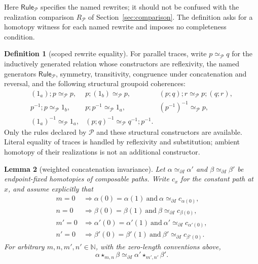 \documentclass[10pt,reqno]{amsart}
\theoremstyle{definition}
\newtheorem{definition}{Definition}[section]
\theoremstyle{plain}
\newtheorem{lemma}[definition]{Lemma}
\theoremstyle{remark}
\newcommand{\RwEq}{\mathrel{\simeq_{\!\mathcal P}}}
\newcommand{\N}{\mathbb N}
\begin{document}
Here $\mathsf{Rule}_{\mathcal P}$ specifies the named rewrites; it should
not be confused with the realization comparison $R_{\mathcal P}$ of Section~\ref{sec:comparison}.
The definition asks for a homotopy witness for each named rewrite and imposes
no completeness condition.

\begin{definition}[scoped rewrite equality]\label{def:scoped-rewrite-equality}
For parallel traces, write $p\RwEq q$ for the inductively generated relation
whose constructors are reflexivity, the named generators $\mathsf{Rule}_{\mathcal P}$,
symmetry, transitivity, congruence under concatenation and reversal, and the
following structural groupoid coherences:
\[
\begin{array}{lll}
(1_a);p\RwEq p, & p;(1_b)\RwEq p, & (p;q);r\RwEq p;(q;r),\\
p^{-1};p\RwEq 1_b, & p;p^{-1}\RwEq 1_a, & (p^{-1})^{-1}\RwEq p,\\
(1_a)^{-1}\RwEq 1_a, & (p;q)^{-1}\RwEq q^{-1};p^{-1}. &
\end{array}
\]
Only the rules declared by $\mathcal P$ and these structural constructors are
available.  Literal equality of traces is handled by reflexivity and
substitution; ambient homotopy of their realizations is not an additional
constructor.
\end{definition}

\begin{lemma}[weighted concatenation invariance]
\label{lem:weighted-concat-invariance}
Let $\alpha\simeq_{\partial I}\alpha'$ and
$\beta\simeq_{\partial I}\beta'$ be endpoint-fixed homotopies of composable
paths.  Write $c_x$ for the constant path at $x$, and assume explicitly that
\[
\begin{aligned}
m=0&\Rightarrow \alpha(0)=\alpha(1)\ \text{and}\ \alpha\simeq_{\partial I}c_{\alpha(0)},\\
n=0&\Rightarrow \beta(0)=\beta(1)\ \text{and}\ \beta\simeq_{\partial I}c_{\beta(0)},\\
m'=0&\Rightarrow \alpha'(0)=\alpha'(1)\ \text{and}\ \alpha'\simeq_{\partial I}c_{\alpha'(0)},\\
n'=0&\Rightarrow \beta'(0)=\beta'(1)\ \text{and}\ \beta'\simeq_{\partial I}c_{\beta'(0)}.
\end{aligned}
\]
For arbitrary
$m,n,m',n'\in\N$, with the zero-length conventions above,
\[
  \alpha\star_{m,n}\beta
  \simeq_{\partial I}
  \alpha'\star_{m',n'}\beta'.
\]
\end{lemma}
\end{document}
